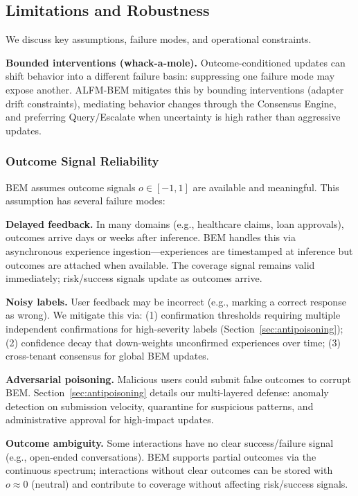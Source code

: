 \documentclass[twoside,11pt]{article}
\begin{document}
\subsection{Limitations and Robustness}
\label{sec:limitations}

We discuss key assumptions, failure modes, and operational constraints.

\textbf{Bounded interventions (whack-a-mole).} Outcome-conditioned updates can shift behavior into a different failure basin: suppressing one failure mode may expose another. ALFM-BEM mitigates this by bounding interventions (adapter drift constraints), mediating behavior changes through the Consensus Engine, and preferring Query/Escalate when uncertainty is high rather than aggressive updates.

\subsubsection{Outcome Signal Reliability}

BEM assumes outcome signals $o \in [-1, 1]$ are available and meaningful. This assumption has several failure modes:

\textbf{Delayed feedback.} In many domains (e.g., healthcare claims, loan approvals), outcomes arrive days or weeks after inference. BEM handles this via asynchronous experience ingestion---experiences are timestamped at inference but outcomes are attached when available. The coverage signal remains valid immediately; risk/success signals update as outcomes arrive.

\textbf{Noisy labels.} User feedback may be incorrect (e.g., marking a correct response as wrong). We mitigate this via: (1) confirmation thresholds requiring multiple independent confirmations for high-severity labels (Section~\ref{sec:antipoisoning}); (2) confidence decay that down-weights unconfirmed experiences over time; (3) cross-tenant consensus for global BEM updates.

\textbf{Adversarial poisoning.} Malicious users could submit false outcomes to corrupt BEM. Section~\ref{sec:antipoisoning} details our multi-layered defense: anomaly detection on submission velocity, quarantine for suspicious patterns, and administrative approval for high-impact updates.

\textbf{Outcome ambiguity.} Some interactions have no clear success/failure signal (e.g., open-ended conversations). BEM supports partial outcomes via the continuous spectrum; interactions without clear outcomes can be stored with $o \approx 0$ (neutral) and contribute to coverage without affecting risk/success signals.
\end{document}
